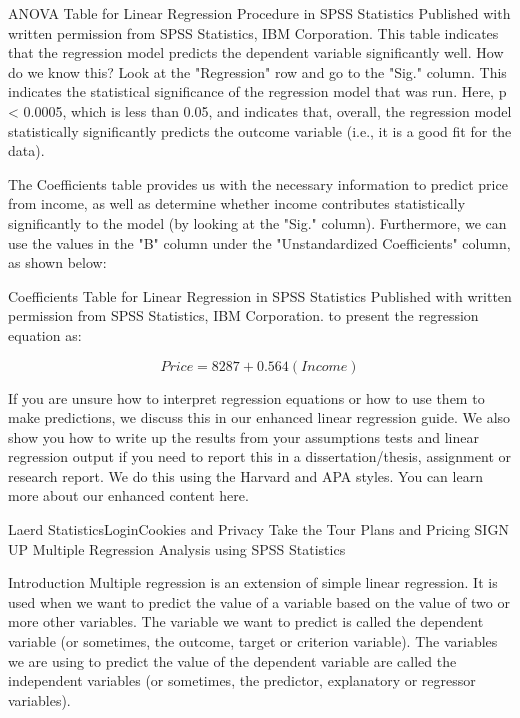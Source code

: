 \documentclass[]{article}
\begin{document}
	ANOVA Table for Linear Regression Procedure in SPSS Statistics
	Published with written permission from SPSS Statistics, IBM Corporation.
	This table indicates that the regression model predicts the dependent variable significantly well. How do we know this? Look at the "Regression" row and go to the "Sig." column. This indicates the statistical significance of the regression model that was run. Here, p < 0.0005, which is less than 0.05, and indicates that, overall, the regression model statistically significantly predicts the outcome variable (i.e., it is a good fit for the data).
	
	The Coefficients table provides us with the necessary information to predict price from income, as well as determine whether income contributes statistically significantly to the model (by looking at the "Sig." column). Furthermore, we can use the values in the "B" column under the "Unstandardized Coefficients" column, as shown below:
	
	Coefficients Table for Linear Regression in SPSS Statistics
	Published with written permission from SPSS Statistics, IBM Corporation.
	to present the regression equation as:
	
	\[Price = 8287 + 0.564(Income)\]
	
	If you are unsure how to interpret regression equations or how to use them to make predictions, we discuss this in our enhanced linear regression guide. We also show you how to write up the results from your assumptions tests and linear regression output if you need to report this in a dissertation/thesis, assignment or research report. We do this using the Harvard and APA styles. You can learn more about our enhanced content here.
	
	
	Laerd StatisticsLoginCookies and Privacy
	Take the Tour Plans and Pricing SIGN UP
	Multiple Regression Analysis using SPSS Statistics
	
	Introduction
	Multiple regression is an extension of simple linear regression. It is used when we want to predict the value of a variable based on the value of two or more other variables. The variable we want to predict is called the dependent variable (or sometimes, the outcome, target or criterion variable). The variables we are using to predict the value of the dependent variable are called the independent variables (or sometimes, the predictor, explanatory or regressor variables).
	
\end{document}
